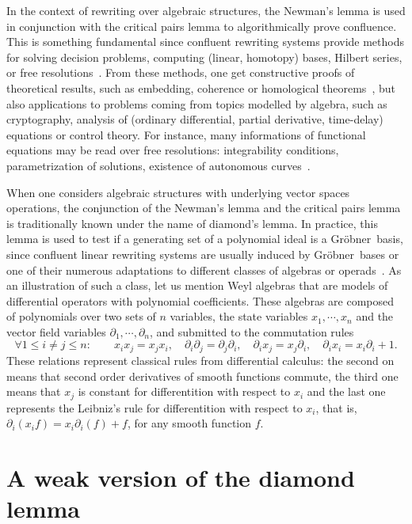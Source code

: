 \documentclass[10pt]{easychair}
\theoremstyle{definition}
\newcommand\G{Gröbner}
\begin{document}
In the context of rewriting over algebraic structures, the Newman's lemma
is used in conjunction with the critical pairs lemma to algorithmically
prove confluence. This is something fundamental since confluent rewriting
systems provide methods for solving decision problems, computing (linear,
homotopy) bases, Hilbert series, or free
resolutions~\cite{MR846601, MR2964639, MR1072284, MR1360005}. From these 
methods, one get constructive proofs of theoretical results, such as 
embedding, coherence or homological theorems~\cite{MR506890, MR0506423,
  MR3347996, MR3742562, MR265437, MR920522}, but also applications to 
problems coming from topics modelled by algebra, such as cryptography, 
analysis of (ordinary differential, partial derivative, time-delay) 
equations or control theory. For instance, many informations of 
functional equations may be read over free resolutions: integrability
conditions, parametrization of solutions, existence of autonomous
curves~\cite{MR2233761, MR1308976}.
\medskip

When one considers algebraic structures with underlying vector spaces
operations, the conjunction of the Newman's lemma and the critical pairs
lemma is traditionally known under the name of diamond's lemma. In 
practice, this lemma is used to test if a generating set of a polynomial
ideal is a \G\ basis, since confluent linear rewriting systems are 
usually induced by \G\ bases or one of their numerous adaptations to
different classes of algebras or operads~\cite{MR506890, MR2202562,
  MR2667136, MR1044911, MR1299371}. As an illustration of such a class,
let us mention Weyl algebras that are models of differential operators
with polynomial coefficients. These algebras are composed of polynomials
over two sets of $n$ variables, the state variables $x_1,\cdots,x_n$ and
the vector field variables $\partial_1,\cdots,\partial_n$, and submitted
to the commutation rules
\[\forall 1\leq i\neq j\leq n:\qquad x_ix_j=x_jx_i,\quad\partial_i
\partial_j=\partial_j\partial_i,\quad\partial_ix_j=x_j\partial_i,\quad
\partial_ix_i=x_i\partial_i+1.\]
These relations represent classical rules from differential calculus: the
second on means that second order derivatives of smooth functions
commute, the third one means that $x_j$ is constant for differentition
with respect to $x_i$ and the last one represents the Leibniz's rule for
differentition with respect to $x_i$, that is,
$\partial_i(x_if)=x_i\partial_i(f)+f$, for any smooth function $f$.
\medskip

\section{A weak version of the diamond lemma}
\label{sec:a_weak_version_of_the_diamond_lemma}
\end{document}
